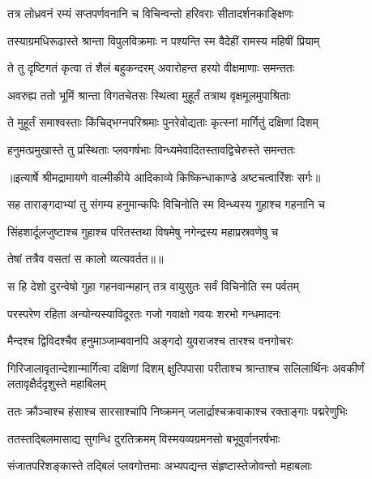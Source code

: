 \twolineshloka
{तत्र लोध्रवनं रम्यं सप्तपर्णवनानि च}
{विचिन्वन्तो हरिवराः सीतादर्शनकाङ्क्षिणः} %

\twolineshloka
{तस्याग्रमधिरूढास्ते श्रान्ता विपुलविक्रमाः}
{न पश्यन्ति स्म वैदेहीं रामस्य महिषीं प्रियाम्} %

\twolineshloka
{ते तु दृष्टिगतं कृत्वा तं शैलं बहुकन्दरम्}
{अवारोहन्त हरयो वीक्षमाणाः समन्ततः} %

\twolineshloka
{अवरुह्य ततो भूमिं श्रान्ता विगतचेतसः}
{स्थित्वा मुहूर्तं तत्राथ वृक्षमूलमुपाश्रिताः} %

\twolineshloka
{ते मुहूर्तं समाश्वस्ताः किंचिद्भग्नपरिश्रमाः}
{पुनरेवोद्यताः कृत्स्नां मार्गितुं दक्षिणां दिशम्} %

\twolineshloka
{हनुमत्प्रमुखास्ते तु प्रस्थिताः प्लवगर्षभाः}
{विन्ध्यमेवादितस्तावद्विचेरुस्ते समन्ततः} %


{॥इत्यार्षे श्रीमद्रामायणे वाल्मीकीये आदिकाव्ये किष्किन्धाकाण्डे अष्टचत्वारिंशः सर्गः॥}


\twolineshloka
{सह ताराङ्गदाभ्यां तु संगम्य हनुमान्कपिः}
{विचिनोति स्म विन्ध्यस्य गुहाश्च गहनानि च} %

\twolineshloka
{सिंहशार्दूलजुष्टाश्च गुहाश्च परितस्तथा}
{विषमेषु नगेन्द्रस्य महाप्रस्रवणेषु च} %

{तेषां तत्रैव वसतां स कालो व्यत्यवर्तत॥॥} %

\addtocounter{shlokacount}{1}

\twolineshloka
{स हि देशो दुरन्वेषो गुहा गहनवान्महान्}
{तत्र वायुसुतः सर्वं विचिनोति स्म पर्वतम्} %

\twolineshloka
{परस्परेण रहिता अन्योन्यस्याविदूरतः}
{गजो गवाक्षो गवयः शरभो गन्धमादनः} %

\twolineshloka
{मैन्दश्च द्विविदश्चैव हनुमाञ्जाम्बवानपि}
{अङ्गदो युवराजश्च तारश्च वनगोचरः} %

\threelineshloka
{गिरिजालावृतान्देशान्मार्गित्वा दक्षिणां दिशम्}
{क्षुत्पिपासा परीताश्च श्रान्ताश्च सलिलार्थिनः}
{अवकीर्णं लतावृक्षैर्ददृशुस्ते महाबिलम्} %

\twolineshloka
{ततः क्रौञ्चाश्च हंसाश्च सारसाश्चापि निष्क्रमन्}
{जलार्द्राश्चक्रवाकाश्च रक्ताङ्गाः पद्मरेणुभिः} %

\twolineshloka
{ततस्तद्बिलमासाद्य सुगन्धि दुरतिक्रमम्}
{विस्मयव्यग्रमनसो बभूवुर्वानरर्षभाः} %

\twolineshloka
{संजातपरिशङ्कास्ते तद्बिलं प्लवगोत्तमाः}
{अभ्यपद्यन्त संहृष्टास्तेजोवन्तो महाबलाः} %

